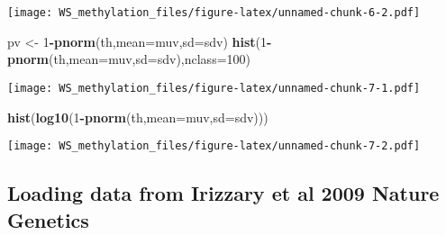 \documentclass[
]{article}
\newenvironment{Shaded}{\begin{snugshade}}{\end{snugshade}}
\newcommand{\DataTypeTok}[1]{\textcolor[rgb]{0.13,0.29,0.53}{#1}}
\newcommand{\DecValTok}[1]{\textcolor[rgb]{0.00,0.00,0.81}{#1}}
\newcommand{\KeywordTok}[1]{\textcolor[rgb]{0.13,0.29,0.53}{\textbf{#1}}}
\newcommand{\NormalTok}[1]{#1}
\newcommand{\OperatorTok}[1]{\textcolor[rgb]{0.81,0.36,0.00}{\textbf{#1}}}
\newcommand{\StringTok}[1]{\textcolor[rgb]{0.31,0.60,0.02}{#1}}
\begin{document}
\texttt{[image: WS\_methylation\_files/figure-latex/unnamed-chunk-6-2.pdf]}

\begin{Shaded}
\begin{Highlighting}[]
\NormalTok{pv <-}\StringTok{ }\DecValTok{1}\OperatorTok{-}\KeywordTok{pnorm}\NormalTok{(th,}\DataTypeTok{mean=}\NormalTok{muv,}\DataTypeTok{sd=}\NormalTok{sdv)}
\KeywordTok{hist}\NormalTok{(}\DecValTok{1}\OperatorTok{-}\KeywordTok{pnorm}\NormalTok{(th,}\DataTypeTok{mean=}\NormalTok{muv,}\DataTypeTok{sd=}\NormalTok{sdv),}\DataTypeTok{nclass=}\DecValTok{100}\NormalTok{)}
\end{Highlighting}
\end{Shaded}

\texttt{[image: WS\_methylation\_files/figure-latex/unnamed-chunk-7-1.pdf]}

\begin{Shaded}
\begin{Highlighting}[]
\KeywordTok{hist}\NormalTok{(}\KeywordTok{log10}\NormalTok{(}\DecValTok{1}\OperatorTok{-}\KeywordTok{pnorm}\NormalTok{(th,}\DataTypeTok{mean=}\NormalTok{muv,}\DataTypeTok{sd=}\NormalTok{sdv)))}
\end{Highlighting}
\end{Shaded}

\texttt{[image: WS\_methylation\_files/figure-latex/unnamed-chunk-7-2.pdf]}

\hypertarget{loading-data-from-irizzary-et-al-2009-nature-genetics}{%
\subsection{Loading data from Irizzary et al 2009 Nature
Genetics}\label{loading-data-from-irizzary-et-al-2009-nature-genetics}}
\end{document}

